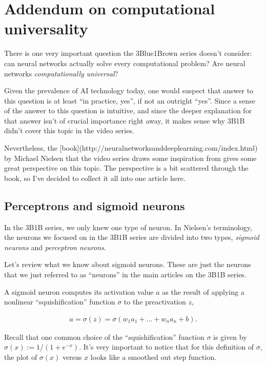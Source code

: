 \documentclass{article}
\begin{document}
	\section*{Addendum on computational universality}
	
	There is one very important question the 3Blue1Brown series doesn't consider: can neural networks actually solve every computational problem? Are neural networks \textit{computationally universal}?
	
	Given the prevalence of AI technology today, one would suspect that answer to this question is at least ``in practice, yes'', if not an outright ``yes''. Since a sense of the answer to this question is intuitive, and since the deeper explanation for that answer isn't of crucial importance right away, it makes sense why 3B1B didn't cover this topic in the video series. 
	
	Nevertheless, the [book](http://neuralnetworksanddeeplearning.com/index.html) by Michael Nielsen that the video series draws some inspiration from gives some great perspective on this topic. The perspective is a bit scattered through the book, so I've decided to collect it all into one article here.
	
	\subsection*{Perceptrons and sigmoid neurons}
	
	In the 3B1B series, we only knew one type of neuron. In Nielsen's terminology, the neurons we focused on in the 3B1B series are divided into two types, \textit{sigmoid neurons} and \textit{perceptron neurons}.
	
	Let's review what we know about sigmoid neurons. These are just the neurons that we just referred to as ``neurons'' in the main articles on the 3B1B series.
	
	A sigmoid neuron computes its activation value $a$ as the result of applying a nonlinear ``squishification'' function $\sigma$ to the preactivation $z$,
	
	\begin{align*}
		a = \sigma(z) = \sigma(w_1 a_1 + ... + w_n a_n + b).
	\end{align*}
	
	Recall that one common choice of the ``squishification'' function $\sigma$ is given by $\sigma(x) := 1/(1 + e^{-x})$. It's very important to notice that for this definition of $\sigma$, the plot of $\sigma(x)$ versus $x$ looks like a smoothed out step function.
	
\end{document}
